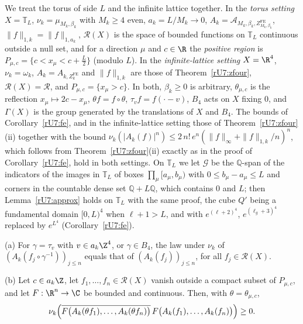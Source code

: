 We treat the torus of side $L$ and the infinite lattice together. In the
\emph{torus setting} $X=\mathbb T_L$, $\nu_k=\mu_{M_k,\beta_k}$ with $M_k\ge4$
even, $a_k=L/M_k\to0$, $A_k=\mathcal A_{M_k,\beta_k,Z^{\mathrm{FE}}_{M_k,
\beta_k}}$, $\|f\|_{1,k}=\|f\|_{1,a_k}$, $\mathcal R(X)$ is the space of
bounded functions on $\mathbb T_L$ continuous outside a null set, and for a
direction $\mu$ and $c\in\R$ the \emph{positive region} is $P_{\mu,c}=\{c<
x_\mu<c+\frac L2\}$ (modulo $L$). In the \emph{infinite-lattice setting}
$X=\R^4$, $\nu_k=\omega_k$, $A_k=A_{k,Z^{\mathrm{FE}}_k}$ and $\|f\|_{1,k}$ are
those of Theorem~\ref{rU7:zfour}, $\mathcal R(X)=\mathcal R$, and $P_{\mu,c}=
\{x_\mu>c\}$. In both, $\beta_k\ge0$ is arbitrary, $\theta_{\mu,c}$ is the
reflection $x_\mu\mapsto2c-x_\mu$, $\theta f=f\circ\theta$, $\tau_vf=f(\cdot-v)$,
$B_4$ acts on $X$ fixing $0$, and $\Gamma(X)$ is the group generated by the
translations of $X$ and $B_4$. The bounds of Corollary~\ref{rU7:fe}, and in the
infinite-lattice setting those of Theorem~\ref{rU7:zfour}(ii) together with
the bound $\nu_k(|A_k(f)|^n)\le2\,n!\,e^n(\|f\|_\infty+\|f\|_{1,k}/n)^n$, which
follows from Theorem~\ref{rU7:zfour}(ii) exactly as in the proof of
Corollary~\ref{rU7:fe}, hold in both settings. On $\mathbb T_L$ we let
$\mathcal G$ be the $\mathbb Q$-span of the indicators of the images in
$\mathbb T_L$ of boxes $\prod_\mu[a_\mu,b_\mu)$ with $0\le b_\mu-a_\mu\le L$ and
corners in the countable dense set $\mathbb Q+L\mathbb Q$, which contains
$0$ and $L$; then Lemma~\ref{rU7:approx} holds on $\mathbb T_L$ with the same
proof, the cube $Q'$ being a fundamental domain $[0,L)^4$ when $\ell+1>L$,
and with $e^{(\ell+2)^4}$, $e^{(\ell_g+3)^4}$ replaced by $e^{L^4}$
(Corollary~\ref{rU7:fe}).

\begin{lemma}\label{rU7:latsym}
\textup{(a)} For $\gamma=\tau_v$ with $v\in a_k\Z^4$, or $\gamma\in B_4$, the
law under $\nu_k$ of $(A_k(f_j\circ\gamma^{-1}))_{j\le n}$ equals that of
$(A_k(f_j))_{j\le n}$, for all $f_j\in\mathcal R(X)$.

\textup{(b)} Let $c\in a_k\Z$, let $f_1,\dots,f_n\in\mathcal R(X)$ vanish outside
a compact subset of $P_{\mu,c}$, and let $F:\R^n\to\C$ be bounded and
continuous. Then, with $\theta=\theta_{\mu,c}$,
\[
\nu_k\Bigl(\overline{F\bigl(A_k(\theta f_1),\dots,A_k(\theta f_n)\bigr)}\,
F\bigl(A_k(f_1),\dots,A_k(f_n)\bigr)\Bigr)\ge0 .
\]
\end{lemma}

